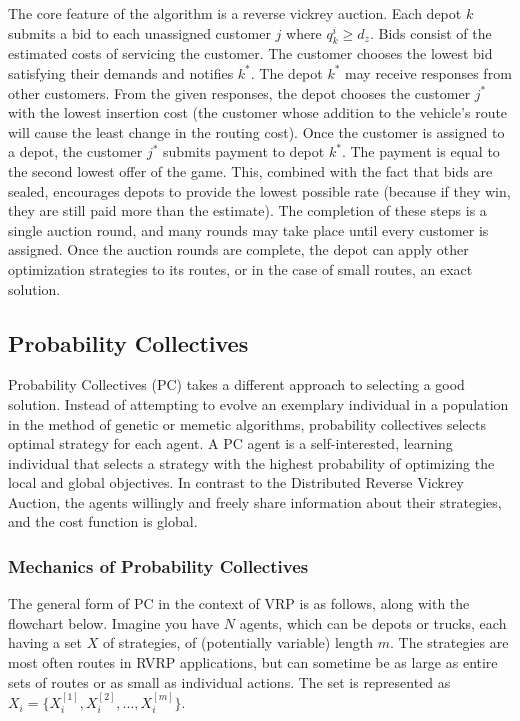 \documentclass{sig-alternate}
\begin{document}
{The core feature of the algorithm is a reverse vickrey auction. Each depot $k$ submits a bid to each unassigned customer $j$ where $q_k^i \geq d_z$. Bids consist of the estimated costs of servicing the customer. The customer chooses the lowest bid satisfying their demands and notifies $k^*$. The depot $k^*$ may receive responses from other customers. From the given responses, the depot chooses the customer $j^*$ with the lowest insertion cost (the customer whose addition to  the vehicle's route will cause the least change  in the routing cost). Once the customer is assigned to a depot, the customer $j^*$ submits payment to depot $k^*$. The payment is equal to the second lowest offer of the game. This, combined with the fact that bids are sealed, encourages depots to provide the lowest possible rate (because if they win, they are still paid more than the estimate). The completion of these steps is a single auction round, and many rounds may take place until every customer is assigned. Once the auction rounds are complete, the depot can apply other optimization strategies to its routes, or in the case of small routes, an exact solution.

\subsection{Probability Collectives}
\label{ssec:PC}
Probability Collectives (PC) takes a different approach to selecting a good solution. Instead of attempting to evolve an exemplary individual in a population in the method of genetic or memetic algorithms, probability collectives selects optimal strategy for each agent\cite{Kulkarni:2008}. A PC agent is a self-interested, learning individual that selects a strategy with the highest probability of optimizing the local and global objectives. In contrast to the Distributed Reverse Vickrey Auction, the agents willingly and freely share information about their strategies, and the cost function is global.

\subsubsection{Mechanics of Probability Collectives}
The general form of PC in the context of VRP is as follows, along with the flowchart below. Imagine you have $N$ agents, which can be depots or trucks, each having a set $X$ of strategies, of (potentially variable) length $m$. The strategies are most often routes in RVRP applications\cite{Vasirani:2008}, but can sometime be as large as entire sets of routes or as small as individual actions. The set is represented as $X_i=\{X_i^{[1]}, X_i^{[2]}, ..., X_i^{[m]}\}$. 

}
\end{document}
